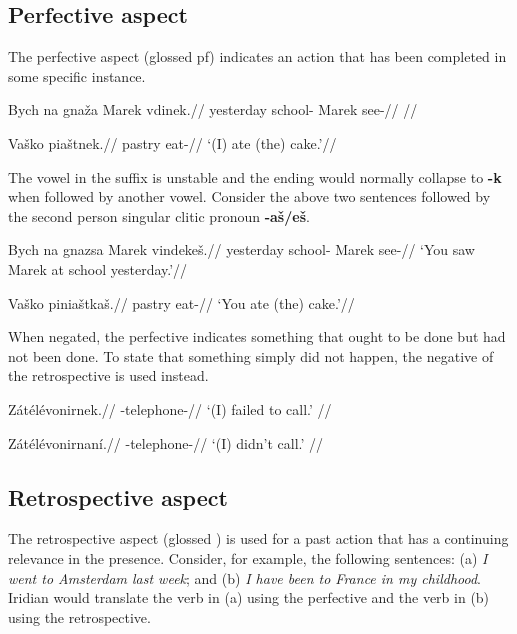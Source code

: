 \subsection{Perfective aspect}
The perfective aspect (glossed {\sc pf}) indicates an action that has been completed in some specific instance.

\pex
\begingl
\gla Bych na gna\v{z}a Marek vdinek.//
\glb yesterday  school- Marek see-//
\glft {}//
\endgl
\xe

\pex
\begingl
\gla Va\v{s}ko pia\v{s}tnek.//
\glb pastry eat-//
\glft `(I) ate (the) cake.'//
\endgl
\xe

\par The vowel in the suffix is unstable and the ending would normally collapse to \textbf{-k} when followed by another vowel. Consider the above two sentences followed by the second person singular clitic pronoun \textbf{-a\v{s}/e\v{s}}.

\pex
\begingl
\gla Bych na gnazsa Marek vindeke\v{s}.//
\glb yesterday  school- Marek see-//
\glft `You saw Marek at school yesterday.'//
\endgl
\xe

\pex
\begingl
\gla Va\v{s}ko pinia\v{s}tka\v{s}.//
\glb pastry eat-//
\glft `You ate (the) cake.'//
\endgl
\xe


\par When negated, the perfective indicates something that ought to be done but had not been done. To state that something simply did not happen, the negative of the retrospective is used instead.

\pex
\begingl
\gla Z\'at\'el\'evonirnek.//
\glb {}-telephone-//
\glft `(I) failed to call.' //
\endgl
\xe

\pex
\begingl
\gla Z\'at\'el\'evonirnan\'i.//
\glb {}-telephone-//
\glft `(I) didn't call.' //
\endgl
\xe

\subsection{Retrospective aspect}
\par The retrospective aspect (glossed ) is used for a past action that has a continuing relevance in the presence. Consider, for example, the following sentences: (a) \textit{I went to Amsterdam last week}; and (b) \textit{I have been to France in my childhood}. Iridian would translate the verb in (a) using the perfective and the verb in (b) using the retrospective.

